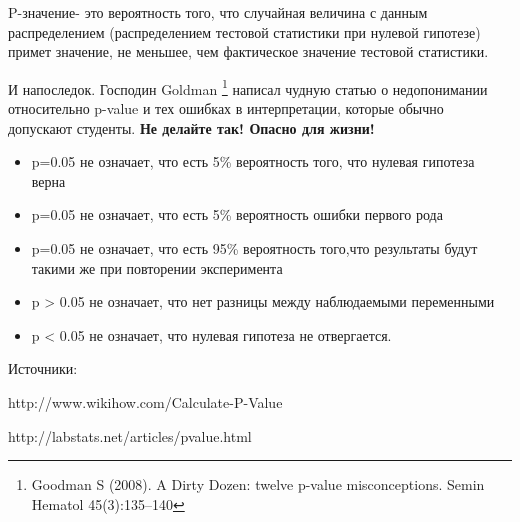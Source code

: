 \documentclass[final,pdftex]{../../template/epsilonj}
\numberwithin{equation}{section}
\begin{document}
P-значение- это вероятность того, что случайная величина с данным распределением (распределением тестовой статистики при нулевой гипотезе) примет значение, не меньшее, чем фактическое значение тестовой статистики.

И напоследок. Господин Goldman \footnote {Goodman S (2008). A Dirty Dozen: twelve p-value misconceptions. Semin Hematol 45(3):135–140} написал чудную статью о недопонимании относительно p-value и тех ошибках в интерпретации, которые обычно допускают студенты. \textbf{Не делайте так! Опасно для жизни!}

\begin{itemize}
	\item p=0.05 не означает, что есть 5\% вероятность того, что нулевая гипотеза верна
	\item p=0.05 не означает, что есть 5\% вероятность ошибки первого рода
	\item p=0.05 не означает, что есть 95\% вероятность того,что результаты будут такими же при повторении эксперимента
	\item p > 0.05 не означает, что нет разницы между наблюдаемыми переменными
	\item p < 0.05 не означает, что нулевая гипотеза не отвергается.
\end{itemize}

Источники:

http://www.wikihow.com/Calculate-P-Value

http://labstats.net/articles/pvalue.html	
	
\end{document}
